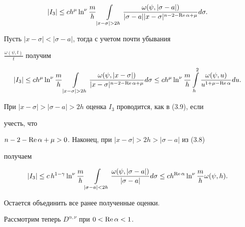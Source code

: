 \begin{pf}
\begin{equation}
|I_3| \le c h^\mu \ln^\nu \frac{m}{h}\int \limits_{|x-\sigma|>2h}


\frac{\omega(\psi,


|\sigma-a|)}{|\sigma-a| |x-\sigma|^{n-2-\re\alpha+\mu}}d\sigma .


\end{equation}





Пусть $|x-\sigma| < |\sigma-a|$, тогда с учетом почти убывания


$\frac{\omega(\psi,t)}{t}$ получим


\begin{equation}


|I_3|\le ch^\mu \ln^\nu \frac{m}{h} \int \limits_{|x-\sigma|>2h}


\frac{\omega(\psi,|x-\sigma|)}{|x-\sigma|^{n-2-\re\alpha+\mu}} d\sigma


\leq ch^\mu \ln^\nu \frac{m}{h} \int \limits_h^2


\frac{\omega(\psi,u)}{u^{1+\mu-\re \alpha}} du.


\end{equation}





При $|x-\sigma|>|\sigma-a|>2h$ оценка $I_3$ проводится, как в (3.9), если


учесть, что


$n-2-\operatorname{Re}\alpha+\mu>0$. Наконец, при $|x-\sigma|>2h>|\sigma-a|$ из (3.8)


получаем


$$


|I_3| \leq c\, h^{1-\gamma} \ln^\nu \frac{m}{h} \int \limits_{|\sigma-


a|<2h} \frac{\omega(\psi,|\sigma-a|)}{|\sigma-a|} d\sigma \leq


ch^{\re \alpha} \ln^\nu \frac{m}{h} \omega(\psi,h).


$$





Остается объединить все ранее полученные оценки.


\end{pf}





Рассмотрим теперь $D^{\alpha,\nu}$ при $0 < \operatorname{Re} \alpha < 1$.





